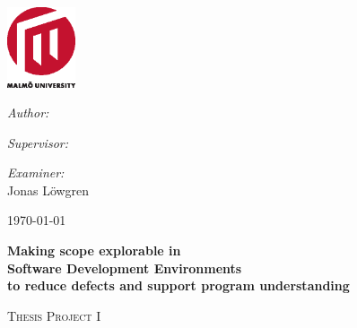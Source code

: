 \begin{titlepage}


\begin{center}

\AddToShipoutPicture*{\BackgroundPic}

\includegraphics[width=0.15\textwidth]{./img/mah2.eps}~\\[1cm]

\vspace*{1.5cm}

\begin{minipage}{0.43\textwidth}
\begin{flushleft} \large
\emph{Author:}\\
\autor
\end{flushleft}
\end{minipage}
\begin{minipage}{0.43\textwidth}
\begin{flushright} \large
\emph{Supervisor:} \\
\supervisor
\end{flushright}
\end{minipage}

\vspace*{0.4cm}

\begin{minipage}{0.86\textwidth}
\begin{flushright} \large
\emph{Examiner:} \\
Jonas Löwgren
\end{flushright}
\end{minipage}

\vspace*{3.5cm}

{\large \today}

\vfill
\begin{minipage}{0.86\textwidth}
\begin{flushleft} \large

\vspace*{0.4cm}
\begin{spacing}{1.0}
{ \huge \bfseries Making scope explorable in\\Software Development Environments\\[0.4cm]\large{to reduce defects and support program understanding}}
\end{spacing}
\vspace*{1.5cm}
\textsc{\Large Thesis Project I}
\end{flushleft}
\end{minipage}




\end{center}
\end{titlepage}
